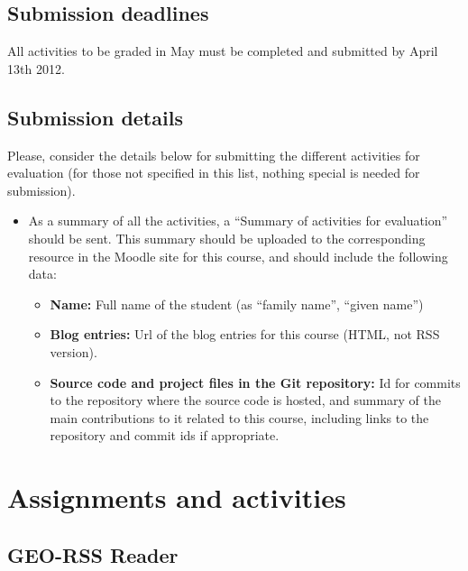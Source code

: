 \documentclass[a4paper]{article}
\begin{document}
\subsection{Submission deadlines}

All activities to be graded in May must be completed and submitted by
April 13th 2012. 

\subsection{Submission details}

Please, consider the details below for submitting the different
activities for evaluation (for those not specified in this list,
nothing special is needed for submission).


\begin{itemize}
\item As a summary of all the activities, a ``Summary of activities
  for evaluation'' should be sent. This summary should be uploaded to
  the corresponding resource in the Moodle site for this course, and
  should include the following data: 
  \begin{itemize}
  \item \textbf{Name:} Full name of the student (as ``family name'', ``given name'')
  \item \textbf{Blog entries:} Url of the blog entries for this course (HTML, not RSS version).
  \item \textbf{Source code and project files in the Git repository:} Id for commits
    to the repository where the source code is hosted, and summary of
    the main contributions to it related to this course, including
    links to the repository and commit ids if appropriate. 
  \end{itemize}
\end{itemize}

\section{Assignments and activities}


\subsection{GEO-RSS Reader}
\label{sub:gnome}
\end{document}
